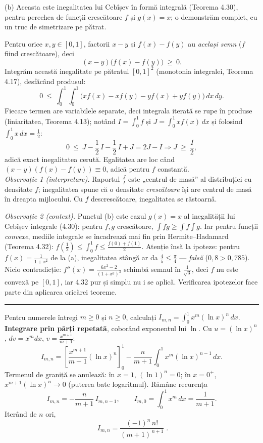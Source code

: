 (b) Aceasta este inegalitatea lui Cebîșev în formă integrală (Teorema 4.30), pentru perechea de funcții crescătoare $f$ și $g(x)=x$; o demonstrăm complet, cu un truc de simetrizare pe pătrat.

Pentru orice $x,y\in[0,1]$, factorii $x-y$ și $f(x)-f(y)$ au \emph{același semn} ($f$ fiind crescătoare), deci
\[ (x-y)\bigl(f(x)-f(y)\bigr)\ \ge\ 0 . \]
Integrăm această inegalitate pe pătratul $[0,1]^{2}$ (monotonia integralei, Teorema 4.17), desfăcând produsul:
\[ 0\ \le\ \int_{0}^{1}\!\!\int_{0}^{1}\bigl(x f(x)-x f(y)-y f(x)+y f(y)\bigr)\,dx\,dy . \]
Fiecare termen are variabilele separate, deci integrala iterată se rupe în produse (liniaritatea, Teorema 4.13); notând $I=\int_{0}^{1}f$ și $J=\int_{0}^{1}xf(x)\,dx$ și folosind $\int_{0}^{1}x\,dx=\frac12$:
\[ 0\ \le\ J-\frac12\,I-\frac12\,I+J=2J-I \Longrightarrow J\ \ge\ \frac{I}{2} , \]
adică exact inegalitatea cerută. Egalitatea are loc când $(x-y)(f(x)-f(y))\equiv0$, adică pentru $f$ constantă.\\[2pt]
\emph{Observație 1 (interpretare).} Raportul $\frac{J}{I}$ este „centrul de masă'' al distribuției cu densitate $f$; inegalitatea spune că o densitate \emph{crescătoare} își are centrul de masă în dreapta mijlocului. Cu $f$ descrescătoare, inegalitatea se răstoarnă.

\emph{Observație 2 (context).} Punctul (b) este cazul $g(x)=x$ al inegalității lui Cebîșev integrale (4.30): pentru $f,g$ crescătoare, $\int fg\ge\int f\int g$. Iar pentru funcții \emph{convexe}, mediile integrale se încadrează mai fin prin Hermite--Hadamard (Teorema 4.32): $f\!\left(\frac12\right)\le\int_{0}^{1}f\le\frac{f(0)+f(1)}{2}$. Atenție însă la ipoteze: pentru $f(x)=\frac{1}{1+x^{2}}$ de la (a), inegalitatea stângă ar da $\frac45\le\frac\pi4$ --- \emph{falsă} ($0{,}8>0{,}785$). Nicio contradicție: $f''(x)=\frac{6x^{2}-2}{(1+x^{2})^{3}}$ schimbă semnul în $\frac{1}{\sqrt3}$, deci $f$ nu este convexă pe $[0,1]$, iar 4.32 pur și simplu nu i se aplică. Verificarea ipotezelor face parte din aplicarea oricărei teoreme.
\vspace{1mm}\hrule

Pentru numerele întregi $m \ge 0$ și $n \ge 0$, calculați $\displaystyle I_{m,n} = \int_0^1 x^m (\ln x)^n \, dx$.
\sol \textbf{Integrare prin părți repetată}, coborând exponentul lui $\ln$. Cu $u = (\ln x)^n$, $dv = x^m dx$, $v = \frac{x^{m+1}}{m+1}$:
\[
I_{m,n} = \left[\frac{x^{m+1}}{m+1}(\ln x)^n\right]_0^1 - \frac{n}{m+1}\int_0^1 x^m (\ln x)^{n-1} \, dx.
\]
Termenul de graniță se anulează: în $x = 1$, $(\ln 1)^n = 0$; în $x = 0^+$, $x^{m+1}(\ln x)^n \to 0$ (puterea bate logaritmul). Rămâne recurența
\[
I_{m,n} = -\frac{n}{m+1} \, I_{m,n-1}, \qquad I_{m,0} = \int_0^1 x^m \, dx = \frac{1}{m+1}.
\]
Iterând de $n$ ori,
\[
\boxed{\; I_{m,n} = \frac{(-1)^n \, n!}{(m+1)^{\,n+1}} \;}.
\]

